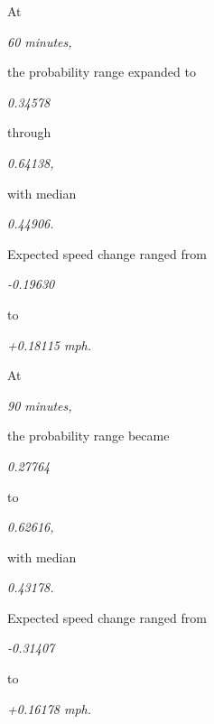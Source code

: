 At

\begin{center}\textit{60 minutes,}\end{center}

the probability range expanded to

\begin{center}\textit{0.34578}\end{center}

through

\begin{center}\textit{0.64138,}\end{center}

with median

\begin{center}\textit{0.44906.}\end{center}

Expected speed change ranged from

\begin{center}\textit{-0.19630}\end{center}

to

\begin{center}\textit{+0.18115 mph.}\end{center}

At

\begin{center}\textit{90 minutes,}\end{center}

the probability range became

\begin{center}\textit{0.27764}\end{center}

to

\begin{center}\textit{0.62616,}\end{center}

with median

\begin{center}\textit{0.43178.}\end{center}

Expected speed change ranged from

\begin{center}\textit{-0.31407}\end{center}

to

\begin{center}\textit{+0.16178 mph.}\end{center}


